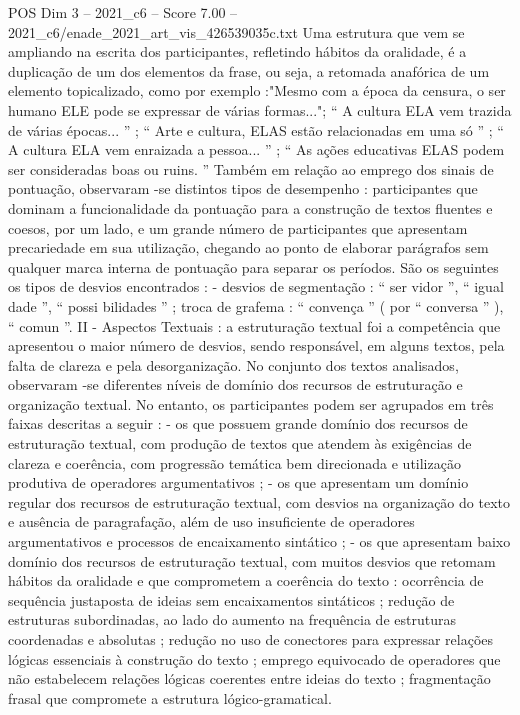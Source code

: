\begin{textsample}{POS Dim 3 – 2021\_c6 – Score 7.00 – 2021\_c6/enade\_2021\_art\_vis\_426539035c.txt}
Uma estrutura que vem se ampliando na escrita dos participantes, refletindo hábitos da oralidade, é a duplicação de um dos elementos da frase, ou seja, a retomada anafórica de um elemento topicalizado, como por exemplo :"Mesmo com a época da censura, o ser humano ELE pode se expressar de várias formas..."; “ A cultura ELA vem trazida de várias épocas... ” ; “ Arte e cultura, ELAS estão relacionadas em uma só ” ; “ A cultura ELA vem enraizada a pessoa... ” ; “ As ações educativas ELAS podem ser consideradas boas ou ruins. ” Também em relação ao emprego dos sinais de pontuação, observaram -se distintos tipos de desempenho : participantes que dominam a funcionalidade da pontuação para a construção de textos fluentes e coesos, por um lado, e um grande número de participantes que apresentam precariedade em sua utilização, chegando ao ponto de elaborar parágrafos sem qualquer marca interna de pontuação para separar os períodos.
São os seguintes os tipos de desvios encontrados : - desvios de segmentação : “ ser vidor ”, “ igual dade ”, “ possi bilidades ” ; troca de grafema : “ convença ” ( por “ conversa ” ), “ comun ”.
II - Aspectos Textuais : a estruturação textual foi a competência que apresentou o maior número de desvios, sendo responsável, em alguns textos, pela falta de clareza e pela desorganização.
No conjunto dos textos analisados, observaram -se diferentes níveis de domínio dos recursos de estruturação e organização textual.
No entanto, os participantes podem ser agrupados em três faixas descritas a seguir : - os que possuem grande domínio dos recursos de estruturação textual, com produção de textos que atendem às exigências de clareza e coerência, com progressão temática bem direcionada e utilização produtiva de operadores argumentativos ; - os que apresentam um domínio regular dos recursos de estruturação textual, com desvios na organização do texto e ausência de paragrafação, além de uso insuficiente de operadores argumentativos e processos de encaixamento sintático ; - os que apresentam baixo domínio dos recursos de estruturação textual, com muitos desvios que retomam hábitos da oralidade e que comprometem a coerência do texto : ocorrência de sequência justaposta de ideias sem encaixamentos sintáticos ; redução de estruturas subordinadas, ao lado do aumento na frequência de estruturas coordenadas e absolutas ; redução no uso de conectores para expressar relações lógicas essenciais à construção do texto ; emprego equivocado de operadores que não estabelecem relações lógicas coerentes entre ideias do texto ; fragmentação frasal que compromete a estrutura lógico-gramatical.

\end{textsample}
